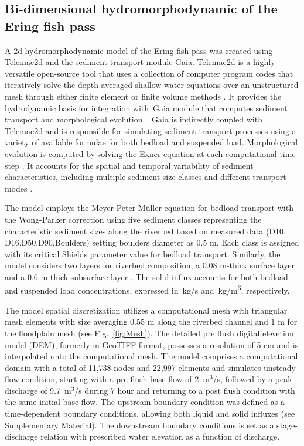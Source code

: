 \documentclass[draft,linenumbers,onecolumn]{agujournal2019} %
\begin{document}
\subsection{Bi-dimensional hydromorphodynamic of the Ering fish pass}
\label{sec:Sec2.3}
A 2d hydromorphodynamic model of the Ering fish pass was created using Telemac2d and the sediment transport module Gaia. Telemac2d is a  highly versatile open-source tool that uses a collection of computer program codes that iteratively solve the depth-averaged shallow water equations \cite{saint-venant1871theorie} over an unstructured mesh through either finite element or finite volume methods \cite{galland1991telemac,hervouet2007hydrodynamics}. It provides the hydrodynamic basis for integration with Gaia module that computes sediment transport and morphological evolution \cite{tassi2023gaia}. Gaia is indirectly coupled with Telemac2d and is responsible for simulating sediment transport processes using a variety of available formulae for both bedload and suspended load. Morphological evolution is computed by solving the Exner equation at each computational time step \cite{audouin2020introducing}. It accounts for the spatial and temporal variability of sediment characteristics, including multiple sediment size classes and different transport modes \cite{exner1925uber,tassi2023gaia}. 

The model employs the Meyer-Peter Müller equation for bedload transport with the Wong-Parker correction \cite{wong2006reanalysis} using five sediment classes representing the characteristic sediment sizes along the riverbed based on measured data (D10, D16,D50,D90,Boulders) setting boulders diameter as 0.5 m. Each class is assigned with its critical Shields parameter value for bedload transport. Similarly, the model considers two layers for riverbed composition, a 0.08 m-thick surface layer and a 0.6 m-thick subsurface layer \cite{scolari2025hydromorphodynamic}. The solid influx accounts for both bedload and suspended load concentrations, expressed in~kg/s and~kg/m\textsuperscript{3}, respectively.

The model spatial discretization utilizes a computational mesh with triangular mesh elements with size averaging 0.55 m along the riverbed channel and 1 m for the floodplain mesh (see Fig.~\ref{fig:Mesh}). The detailed pre flush digital elevetion model (DEM), formerly in GeoTIFF format, possesses a resolution of 5 cm and is interpolated onto the computational mesh. The model comprises a computational domain with a total of 11,738 nodes and 22,997 elements and simulates unsteady flow condition, starting with a pre-flush base flow of 2~m$^3$/s, followed by a peak discharge of 9.7~m$^3$/s during 7 hour and returning to a post flush condition with the same initial base flow. The upstream boundary condition was defined as a time-dependent boundary conditions, allowing both liquid and solid influxes (see Supplementary Material). 
The downstream boundary conditions is set as a stage-discharge relation with prescribed water elevation as a function of discharge. 
\end{document}
